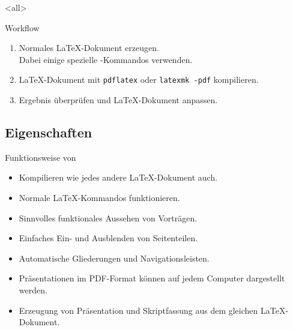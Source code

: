 \mode
<all>

\begin{Frame}{Workflow}
  \begin{enumerate}
    \item Normales \LaTeX-Dokument erzeugen.\\
      Dabei einige spezielle \beamer-Kommandos verwenden.
    \item \LaTeX-Dokument mit \lstinline-pdflatex- oder \lstinline|latexmk -pdf| kompilieren.
    \item Ergebnis überprüfen und \LaTeX-Dokument anpassen.
  \end{enumerate}
\end{Frame}

\subsection{Eigenschaften}

\begin{Frame}{Funktionsweise von \beamer}
  \begin{itemize}
    \item Kompilieren wie jedes andere \LaTeX-Dokument auch.
    \item Normale \LaTeX-Kommandos funktionieren.
    \item Sinnvolles funktionales Aussehen von Vorträgen.
    \item Einfaches Ein- und Ausblenden von Seitenteilen.
    \item Automatische Gliederungen und Navigationsleisten.
    \item Präsentationen im PDF-Format können auf jedem Computer dargestellt werden.
    \item Erzeugung von Präsentation und Skriptfassung aus dem gleichen \LaTeX-Dokument.
  \end{itemize}
\end{Frame}

